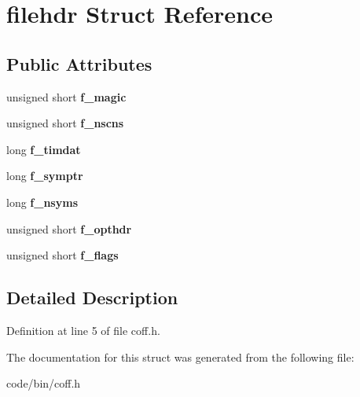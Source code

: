 \section{filehdr Struct Reference}
\label{structfilehdr}
\subsection*{Public Attributes}
\begin{DoxyCompactItemize}
\item 
unsigned short {\bfseries f\+\_\+magic}\label{structfilehdr_a97a52c5bac875ea0afb8eaa6c48b1d2f}

\item 
unsigned short {\bfseries f\+\_\+nscns}\label{structfilehdr_a8d7bc046274a19338a0cc76937c2a68c}

\item 
long {\bfseries f\+\_\+timdat}\label{structfilehdr_aec745145c720ceebceefd28ab788ff31}

\item 
long {\bfseries f\+\_\+symptr}\label{structfilehdr_a7c855272af539edee2873319773fe51d}

\item 
long {\bfseries f\+\_\+nsyms}\label{structfilehdr_a19a3d8196849aaa200cb6cf63574725a}

\item 
unsigned short {\bfseries f\+\_\+opthdr}\label{structfilehdr_ab803a1145d8cec4f9370741cda14f313}

\item 
unsigned short {\bfseries f\+\_\+flags}\label{structfilehdr_ab7b30fd57faaf43e1cbec3e45bda619d}

\end{DoxyCompactItemize}


\subsection{Detailed Description}


Definition at line 5 of file coff.\+h.



The documentation for this struct was generated from the following file\+:\begin{DoxyCompactItemize}
\item 
code/bin/coff.\+h\end{DoxyCompactItemize}
